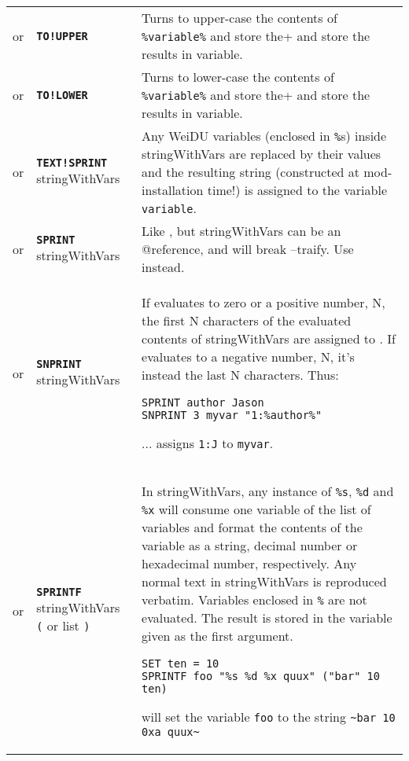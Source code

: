 \documentclass{article}
\def\ttref#1{\ahrefloc{#1}{\tt #1}}
\def\DEFINE#1{{\tt \bf #1}\label{#1}\index{#1}}
\def\t#1{{\tt #1}}
\def\Slist{{\color{red} list }}
\begin{document}
\begin{tabular}{cp{10in}|p{10in}}
or & \DEFINE{TO!UPPER} \ttref{variable} &
  Turns to upper-case the contents of \verb+%variable%+ and store the
  results in variable. \\
or & \DEFINE{TO!LOWER} \ttref{variable} &
  Turns to lower-case the contents of \verb+%variable%+ and store the
  results in variable. \\
or & \DEFINE{TEXT!SPRINT} \ttref{variable} stringWithVars &
  Any WeiDU variables (enclosed in \t{\%}s) inside stringWithVars are
  replaced by their values and the resulting string (constructed at
  mod-installation time!) is assigned to the variable \t{variable}. \\
or & \DEFINE{SPRINT} \ttref{variable} stringWithVars &
  Like \ttref{TEXT!SPRINT}, but stringWithVars can be an @reference, and will
  break --traify. Use \ttref{TEXT!SPRINT} instead. \\

  or & \DEFINE{SNPRINT} \ttref{value} \ttref{variable} stringWithVars &
  If \ttref{value} evaluates to zero or a positive number, N, the first
  N characters of the evaluated contents of stringWithVars are
  assigned to \ttref{variable}. If \ttref{value} evaluates to a
  negative number, N, it's instead the last N characters. Thus:
\begin{verbatim}
SPRINT author Jason
SNPRINT 3 myvar "1:%author%"
\end{verbatim}
  ... assigns \t{1:J} to \t{myvar}.  \\

or & \DEFINE{SPRINTF} \ttref{variable} stringWithVars
\t{(} \ttref{variable} or \ttref{value}  \Slist \t{)} &
In stringWithVars, any instance of \t{\%s}, \t{\%d} and \t{\%x} will consume
one variable of the list of variables and format the contents of the variable
as a string, decimal number or hexadecimal number, respectively. Any normal text
in stringWithVars is reproduced verbatim. Variables enclosed in \t{\%} are not
evaluated. The result is stored in the variable given as the first argument.
\begin{verbatim}
SET ten = 10
SPRINTF foo "%s %d %x quux" ("bar" 10 ten)
\end{verbatim}
will set the variable \t{foo} to the string \verb+~bar 10 0xa quux~+ \\


\end{tabular}
\end{document}
